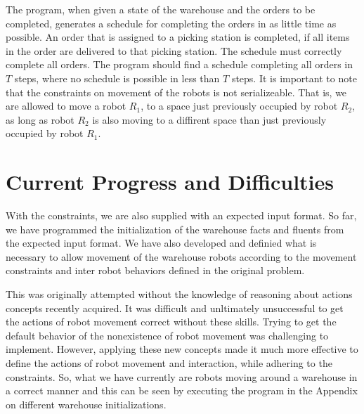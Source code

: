 \documentclass[letterpaper]{article} %
\begin{document}
The program, when given a state of the warehouse and the orders to be completed, generates a schedule for completing the orders in as little time as possible. An order that is assigned to a picking station is completed, if all items in the order are delivered to that picking station. The schedule must correctly complete all orders. The program should find a schedule completing all orders in $T$ steps, where no schedule is possible in less than $T$ steps. It is important to note that the constraints on movement of the robots is not serializeable. That is, we are allowed to move a robot $R_1$, to a space just previously occupied by robot $R_2$, as long as robot $R_2$ is also moving to a diffirent space than just previously occupied by robot $R_1$.

\section{Current Progress and Difficulties}

With the constraints, we are also supplied with an expected input format. So far, we have programmed the initialization of the warehouse facts and fluents from the expected input format. We have also developed and definied what is necessary to allow movement of the warehouse robots according to the movement constraints and inter robot behaviors defined in the original problem. 

This was originally attempted without the knowledge of reasoning about actions concepts recently acquired. It was difficult and unltimately unsuccessful to get the actions of robot movement correct without these skills. Trying to get the default behavior of the nonexistence of robot movement was challenging to implement. However, applying these new concepts made it much more effective to define the actions of robot movement and interaction, while adhering to the constraints. So, what we have currently are robots moving around a warehouse in a correct manner and this can be seen by executing the program in the Appendix on different warehouse initializations. 
\end{document}
